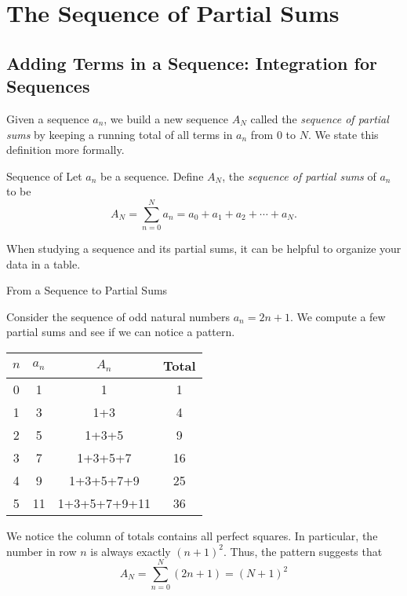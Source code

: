 \section{The Sequence of Partial Sums}

\subsection{Adding Terms in a Sequence: Integration for Sequences}\label{AddingDong}
Given a sequence $a_n$, we build a new sequence $A_N$ called the \emph{sequence of partial sums} by keeping a running total of all terms in $a_n$ from $0$ to $N$.  We state this definition more formally.

\begin{definition}{Sequence of }
Let $a_n$ be a sequence.  Define $A_N$, the \emph{sequence of partial sums} of $a_n$ to be $$A_N=\sum_{n=0}^Na_n=a_0+a_1+a_2+\cdots+a_N. $$
\end{definition}
When studying a sequence and its partial sums, it can be helpful to organize your data in a table.

\begin{example}{From a Sequence to  Partial Sums}\label{OddSum}

Consider the sequence of odd natural numbers $a_n=2n+1$.  We compute a few partial sums and see if we can notice a pattern.

\begin{center}
\begin{tabular}{|c|c|c|c|} \hline
$n$ & $a_n$ & $A_n$ & Total \\ \hline
0 & 1 & 1 &1 \\
1 & 3 & 1+3 &4 \\
2 & 5 & 1+3+5 &9 \\
3 & 7 & 1+3+5+7 &16 \\
4 & 9 & 1+3+5+7+9 &25 \\
5 & 11 &1+3+5+7+9+11 &36 \\ \hline
\end{tabular}
\end{center}

We notice the column of totals contains all perfect squares.  In particular, the number in row $n$ is always exactly $\left(n+1\right)^2$.  Thus, the pattern suggests that
$$A_N=\sum_{n=0}^N\left(2n+1\right) = \left(N+1\right)^2 $$
\end{example}

